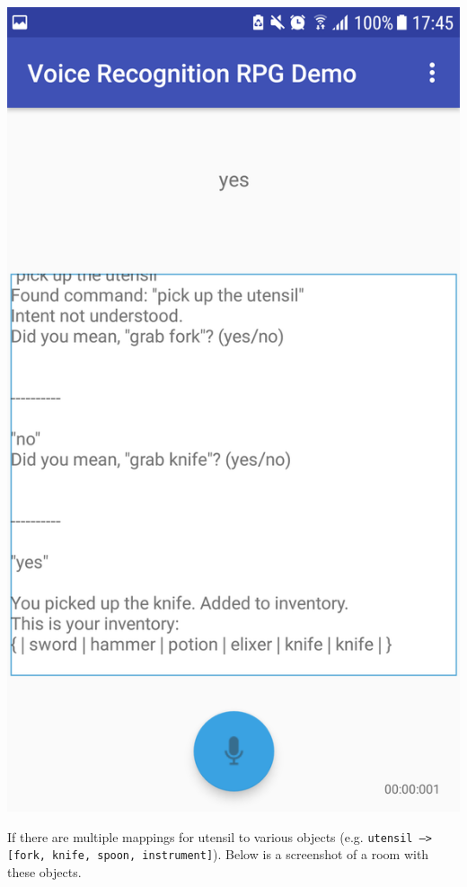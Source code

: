 \documentclass[11pt]{article}
\begin{document}
\begin{center}
\includegraphics[scale=0.18]{utensil-2.png}
\end{center}

\newpage
If there are multiple mappings for utensil to various objects (e.g. \texttt{utensil --> [fork, knife, spoon, instrument]}). Below is a screenshot of a room with these objects.
\end{document}
